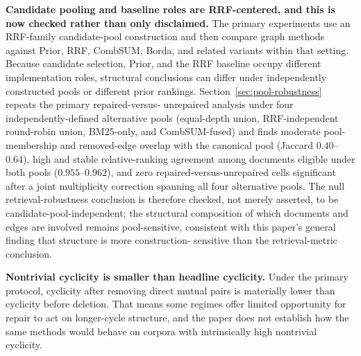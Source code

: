 \documentclass[manuscript,anonymous,review]{acmart}
\begin{document}
\textbf{Candidate pooling and baseline roles are RRF-centered, and this is now
checked rather than only disclaimed.} The primary experiments use an
RRF-family candidate-pool construction and then compare graph methods
against Prior, RRF, CombSUM, Borda, and related variants within that
setting. Because candidate selection, Prior, and the RRF baseline occupy
different implementation roles, structural conclusions can differ under
independently constructed pools or different prior rankings.
Section~\ref{sec:pool-robustness} repeats the primary repaired-versus-
unrepaired analysis under four independently-defined alternative pools
(equal-depth union, RRF-independent round-robin union, BM25-only, and
CombSUM-fused) and finds moderate pool-membership and removed-edge overlap
with the canonical pool (Jaccard $0.40$--$0.64$), high and stable
relative-ranking agreement among documents eligible under both pools
($0.955$--$0.962$), and zero repaired-versus-unrepaired cells significant
after a joint multiplicity correction spanning all four alternative pools.
The null retrieval-robustness conclusion is therefore checked, not merely
asserted, to be candidate-pool-independent; the structural composition of
which documents and edges are involved remains pool-sensitive, consistent
with this paper's general finding that structure is more construction-
sensitive than the retrieval-metric conclusion.

\textbf{Nontrivial cyclicity is smaller than headline cyclicity.} Under the
primary protocol, cyclicity after removing direct mutual pairs is materially
lower than cyclicity before deletion. That means some regimes offer limited
opportunity for repair to act on longer-cycle structure, and the paper does not
establish how the same methods would behave on corpora with intrinsically high
nontrivial cyclicity.
\end{document}
